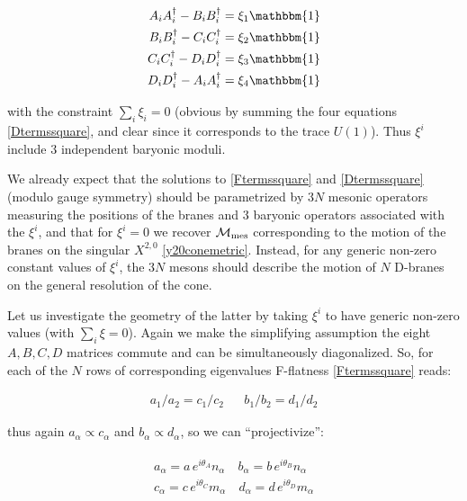 \begin{align}
	\begin{split}
		A_i A^\dagger_i - B_i B^\dagger_i = \xi_1 \mathbbm{1} \\
		B_i B^\dagger_i - C_i C^\dagger_i = \xi_2 \mathbbm{1} \\
		C_i C^\dagger_i - D_i D^\dagger_i = \xi_3 \mathbbm{1} \\
		D_i D^\dagger_i - A_i A^\dagger_i = \xi_4 \mathbbm{1}
	\end{split}
	\label{Dtermssquare}
\end{align}

with the constraint $\sum_i \xi_i = 0$ (obvious by summing the four equations \eqref{Dtermssquare}, and clear since it corresponds to the trace $U(1)$). Thus $\xi^i$ include $3$ independent baryonic moduli.

We already expect that the solutions to \eqref{Ftermssquare} and \eqref{Dtermssquare} (modulo gauge symmetry) should be parametrized by $3N$ mesonic operators measuring the positions of the branes and $3$ baryonic operators associated with the $\xi^i$, and that for $\xi^i = 0$ we recover $\mathcal{M}_\mathrm{mes}$ corresponding to the motion of the branes on the singular $X^{2,0}$ \eqref{y20conemetric}. Instead, for any generic non-zero constant values of $\xi^i$, the $3N$ mesons should describe the motion of $N$ D-branes on the general resolution of the cone. 

Let us investigate the geometry of the latter by taking $\xi^i$ to have generic non-zero values (with $\sum_i \xi = 0$). Again we make the simplifying assumption the eight $A, B, C, D$ matrices commute and can be simultaneously diagonalized. So, for each of the $N$ rows of corresponding eigenvalues F-flatness \eqref{Ftermssquare} reads:

\begin{align}
	a_1/a_2 = c_1/c_2 && b_1/b_2 = d_1 / d_2
	\label{}
\end{align}

thus again $a_\alpha \propto c_\alpha$ and $b_\alpha \propto d_\alpha$, so we can ``projectivize'':

\begin{align}\begin{split}
		a_\alpha = a \, e^{i\theta_A} n_\alpha \quad b_\alpha = b \, e^{i\theta_B} n_\alpha \\
		c_\alpha = c \, e^{i\theta_C} m_\alpha \quad d_\alpha = d \, e^{i\theta_D} m_\alpha 
	\end{split}\end{align}

